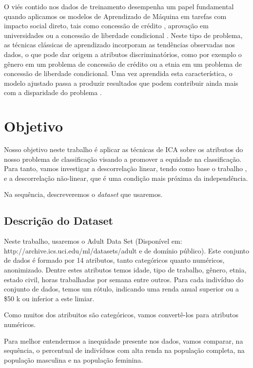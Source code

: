 \documentclass[11pt]{article}
\begin{document}
O viés contido nos dados de treinamento desempenha um papel fundamental
quando aplicamos os modelos de Aprendizado de Máquina em tarefas com
impacto social direto, tais como concessão de crédito \cite{ONeil2016},
aprovação em universidades \cite{ONeil2016} ou a concessão de liberdade
condicional \cite{Chouldechova2017}. Neste tipo de problema, as técnicas
clássicas de aprendizado incorporam as tendências observadas nos dados,
o que pode dar origem a atributos discriminatórios, como por exemplo o
gênero em um problema de concessão de crédito ou a etnia em um problema
de concessão de liberdade condicional. Uma vez aprendida esta
característica, o modelo ajustado passa a produzir resultados que podem
contribuir ainda mais com a disparidade do problema \cite{ONeil2016}.

    \section{Objetivo}\label{objetivo}

Nosso objetivo neste trabalho é aplicar as técnicas de ICA
\cite{Hyvarinen2001} sobre os atributos do nosso problema de
classificação visando a promover a equidade na classificação. Para
tanto, vamos investigar a descorrelação linear, tendo como base o
trabalho \cite{Zafar2017}, e a descorrelação não-linear, que é uma
condição mais próxima da independência.

Na sequência, descreveremos o \emph{dataset} que usaremos.

    \subsection{Descrição do Dataset}\label{descriuxe7uxe3o-do-dataset}

Neste trabalho, usaremos o Adult Data Set (Disponível em:
http://archive.ics.uci.edu/ml/datasets/adult e de domínio público). Este
conjunto de dados é formado por 14 atributos, tanto categóricos quanto
numéricos, anonimizado. Dentre estes atributos temos idade, tipo de
trabalho, gênero, etnia, estado civil, horas trabalhadas por semana
entre outros. Para cada indivíduo do conjunto de dados, temos um rótulo,
indicando uma renda anual superior ou a \$50 k ou inferior a este
limiar.

Como muitos dos atribuitos são categóricos, vamos convertê-los para
atributos numéricos.

    Para melhor entendermos a inequidade presente nos dados, vamos comparar,
na sequência, o percentual de indivíduos com alta renda na população
completa, na população masculina e na população feminina.
\end{document}
